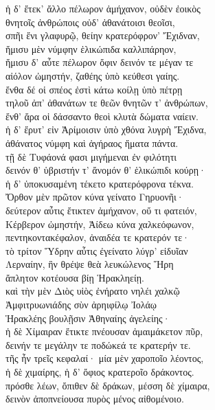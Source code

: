 \begin{pages}
\begin{Leftside}
\quad{}ἡ δ' ἔτεκ' ἄλλο πέλωρον ἀμήχανον, οὐδὲν ἐοικὸς  \\
θνητοῖς ἀνθρώποις οὐδ' ἀθανάτοισι θεοῖσι, \\
σπῆι ἔνι γλαφυρῷ, θείην κρατερόφρον' Ἔχιδναν, \\
ἥμισυ μὲν νύμφην ἑλικώπιδα καλλιπάρηον, \\
ἥμισυ δ' αὖτε πέλωρον ὄφιν δεινόν τε μέγαν τε\\
αἰόλον ὠμηστήν, ζαθέης ὑπὸ κεύθεσι γαίης.  \\
ἔνθα δέ οἱ σπέος ἐστὶ κάτω κοίλῃ ὑπὸ πέτρῃ\\
τηλοῦ ἀπ' ἀθανάτων τε θεῶν θνητῶν τ' ἀνθρώπων,\\
ἔνθ' ἄρα οἱ δάσσαντο θεοὶ κλυτὰ δώματα ναίειν.\\

\quad{}ἡ δ' ἔρυτ' εἰν Ἀρίμοισιν ὑπὸ χθόνα λυγρὴ Ἔχιδνα, \\
ἀθάνατος νύμφη καὶ ἀγήραος ἤματα πάντα. \\
τῇ δὲ Τυφάονά φασι μιγήμεναι ἐν φιλότητι\\
δεινόν θ' ὑβριστήν τ' ἄνομόν θ' ἑλικώπιδι κούρῃ· \\
ἡ δ' ὑποκυσαμένη τέκετο κρατερόφρονα τέκνα.\\
Ὄρθον μὲν πρῶτον κύνα γείνατο Γηρυονῆι· \\
δεύτερον αὖτις ἔτικτεν ἀμήχανον, οὔ τι φατειόν,  \\
Κέρβερον ὠμηστήν, Ἀίδεω κύνα χαλκεόφωνον,\\
πεντηκοντακέφαλον, ἀναιδέα τε κρατερόν τε· \\
τὸ τρίτον Ὕδρην αὖτις ἐγείνατο λύγρ' εἰδυῖαν \\
Λερναίην, ἣν θρέψε θεὰ λευκώλενος Ἥρη\\
ἄπλητον κοτέουσα βίῃ Ἡρακληείῃ. \\
καὶ τὴν μὲν Διὸς υἱὸς ἐνήρατο νηλέι χαλκῷ\\
Ἀμφιτρυωνιάδης σὺν ἀρηιφίλῳ Ἰολάῳ\\
Ἡρακλέης βουλῇσιν Ἀθηναίης ἀγελείης·\\
ἡ δὲ Χίμαιραν ἔτικτε πνέουσαν ἀμαιμάκετον πῦρ,\\
δεινήν τε μεγάλην τε ποδώκεά τε κρατερήν τε.  \\
τῆς ἦν τρεῖς κεφαλαί· μία μὲν χαροποῖο λέοντος,\\
ἡ δὲ χιμαίρης, ἡ δ' ὄφιος κρατεροῖο δράκοντος.\\
πρόσθε λέων, ὄπιθεν δὲ δράκων, μέσση δὲ χίμαιρα,\\
δεινὸν ἀποπνείουσα πυρὸς μένος αἰθομένοιο.\\

\end{Leftside}
\end{pages}
